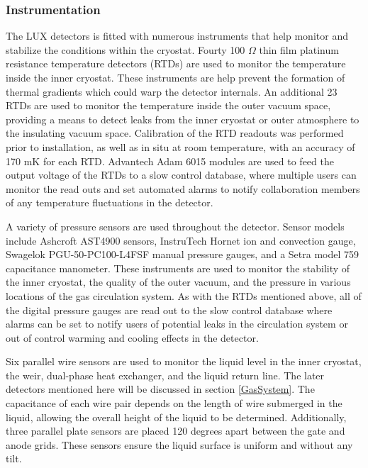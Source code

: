 \documentclass[a4paper,12pt]{article}
\begin{document}
\subsubsection{Instrumentation}

The LUX detectors is fitted with numerous instruments that help monitor and stabilize the conditions within the cryostat. Fourty 100 $\Omega$ thin film platinum resistance temperature detectors (RTDs) are used to monitor the temperature inside the inner cryostat. These instruments are help prevent the formation of thermal gradients which could warp the detector internals.  An additional 23 RTDs are used to monitor the temperature inside the outer vacuum space, providing a means to detect leaks from the inner cryostat or outer atmosphere to the insulating vacuum space. Calibration of the RTD readouts was performed prior to installation, as well as in situ at room temperature, with an accuracy of 170 mK for each RTD.  Advantech Adam 6015 modules are used to feed the output voltage of the RTDs to a slow control database, where multiple users can monitor the read outs and set automated alarms to notify collaboration members of any temperature fluctuations in the detector.  

A variety of pressure sensors are used throughout the detector.  Sensor models include Ashcroft AST4900 sensors, InstruTech Hornet ion and convection gauge, Swagelok PGU-50-PC100-L4FSF manual pressure gauges, and a Setra model 759 capacitance manometer.  These instruments are used to monitor the stability of the inner cryostat, the quality of the outer vacuum, and the pressure in various locations of the gas circulation system.  As with the RTDs mentioned above, all of the digital pressure gauges are read out to the slow control database where alarms can be set to notify users of potential leaks in the circulation system or out of control warming and cooling effects in the detector.

Six parallel wire sensors are used to monitor the liquid level in the inner cryostat, the weir, dual-phase heat exchanger, and the liquid return line.   The later detectors mentioned here will be discussed in section \ref{GasSystem}.  The capacitance of each wire pair depends on the length of wire submerged in the liquid, allowing the overall height of the liquid to be determined.  Additionally, three parallel plate sensors are placed 120 degrees apart between the gate and anode grids.  These sensors ensure the liquid surface is uniform and without any tilt.    
\end{document}
